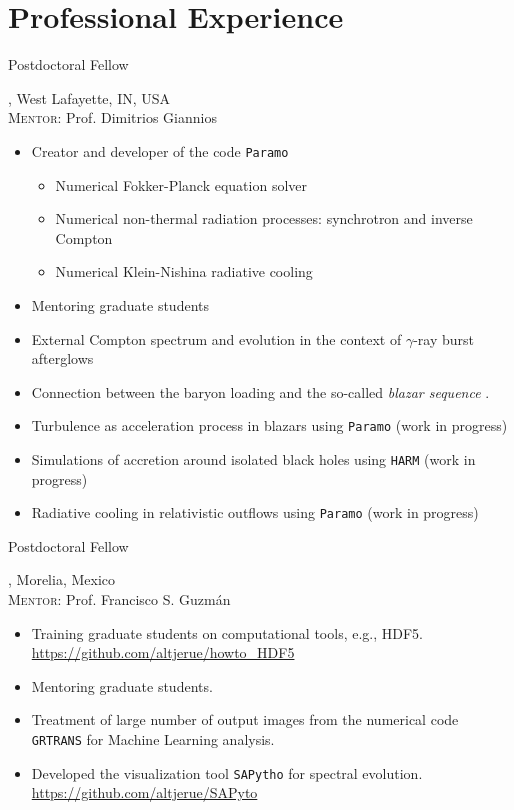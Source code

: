%
\section{Professional Experience}

%
{\DPA}{Postdoctoral Fellow}{}{}%
{\Purdue, West Lafayette, IN, USA\\
  \textsc{Mentor}: Prof. Dimitrios Giannios
  \begin{itemize}
    \item Creator and developer of the code \texttt{Paramo}
    \begin{itemize}
      \item Numerical Fokker-Planck equation solver
      \item Numerical non-thermal radiation processes: synchrotron and inverse Compton
      \item Numerical Klein-Nishina radiative cooling
    \end{itemize}
    \item Mentoring graduate students
    \item External Compton spectrum and evolution in the context of $\gamma$-ray burst afterglows \cite{Zhang:2020ch}
    \item Connection between the baryon loading and the so-called \emph{blazar sequence} \cite{RuedaBecerril:2020ha}.
    \item Turbulence as acceleration process in blazars using \texttt{Paramo} (work in progress)
    \item Simulations of accretion around isolated black holes using \texttt{HARM} (work in progress)
    \item Radiative cooling in relativistic outflows using \texttt{Paramo} (work in progress)
  \end{itemize}
}
%
{\IFMes}{Postdoctoral Fellow}{}{}%
{\UMSNHes, Morelia, Mexico\\
  \textsc{Mentor}: Prof. Francisco S. Guzmán
  \begin{itemize}
    \item Training graduate students on computational tools, e.g., HDF5. \url{https://github.com/altjerue/howto_HDF5}
    \item Mentoring graduate students.
    \item Treatment of large number of output images from the numerical code \texttt{GRTRANS} for Machine Learning analysis.
    \item Developed the visualization tool \texttt{SAPytho} for spectral evolution. \url{https://github.com/altjerue/SAPyto}
  \end{itemize}
}
